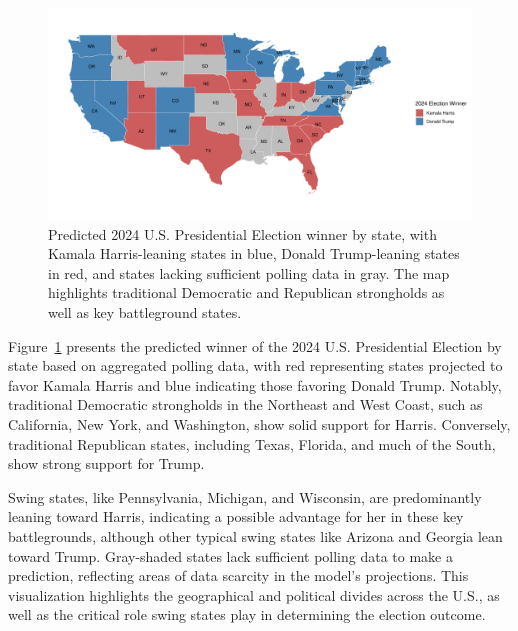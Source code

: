 \documentclass[
  letterpaper,
  DIV=11,
  numbers=noendperiod]{scrartcl}
\begin{document}
\begin{figure}

{\centering \includegraphics{paper_files/figure-pdf/fig-map2-1.pdf}

}

\caption{\label{fig-map2}Predicted 2024 U.S. Presidential Election
winner by state, with Kamala Harris-leaning states in blue, Donald
Trump-leaning states in red, and states lacking sufficient polling data
in gray. The map highlights traditional Democratic and Republican
strongholds as well as key battleground states.}

\end{figure}

Figure~\ref{fig-map2} presents the predicted winner of the 2024 U.S.
Presidential Election by state based on aggregated polling data, with
red representing states projected to favor Kamala Harris and blue
indicating those favoring Donald Trump. Notably, traditional Democratic
strongholds in the Northeast and West Coast, such as California, New
York, and Washington, show solid support for Harris. Conversely,
traditional Republican states, including Texas, Florida, and much of the
South, show strong support for Trump.

Swing states, like Pennsylvania, Michigan, and Wisconsin, are
predominantly leaning toward Harris, indicating a possible advantage for
her in these key battlegrounds, although other typical swing states like
Arizona and Georgia lean toward Trump. Gray-shaded states lack
sufficient polling data to make a prediction, reflecting areas of data
scarcity in the model's projections. This visualization highlights the
geographical and political divides across the U.S., as well as the
critical role swing states play in determining the election outcome.
\end{document}

